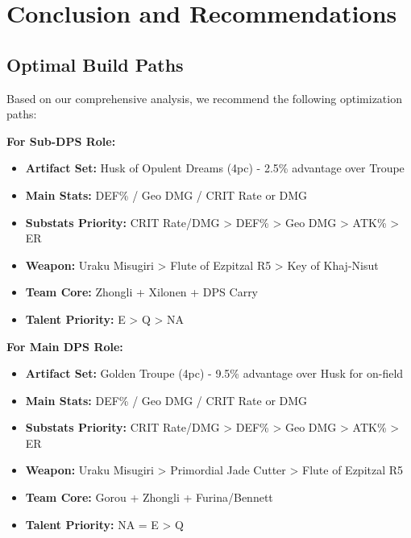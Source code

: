 \documentclass[12pt,a4paper]{article}
\begin{document}
\section{Conclusion and Recommendations}

\subsection{Optimal Build Paths}

Based on our comprehensive analysis, we recommend the following optimization paths:

\begin{tcolorbox}[colback=c0color!5, colframe=c0color, title=C0 Chiori Recommendations]
\textbf{For Sub-DPS Role:}
\begin{itemize}
    \item \textbf{Artifact Set:} Husk of Opulent Dreams (4pc) - 2.5\% advantage over Troupe
    \item \textbf{Main Stats:} DEF\% / Geo DMG / CRIT Rate or DMG
    \item \textbf{Substats Priority:} CRIT Rate/DMG > DEF\% > Geo DMG > ATK\% > ER
    \item \textbf{Weapon:} Uraku Misugiri > Flute of Ezpitzal R5 > Key of Khaj-Nisut
    \item \textbf{Team Core:} Zhongli + Xilonen + DPS Carry
    \item \textbf{Talent Priority:} E > Q > NA
\end{itemize}
\end{tcolorbox}

\begin{tcolorbox}[colback=c6color!5, colframe=c6color, title=C6 Chiori Recommendations]
\textbf{For Main DPS Role:}
\begin{itemize}
    \item \textbf{Artifact Set:} Golden Troupe (4pc) - 9.5\% advantage over Husk for on-field
    \item \textbf{Main Stats:} DEF\% / Geo DMG / CRIT Rate or DMG
    \item \textbf{Substats Priority:} CRIT Rate/DMG > DEF\% > Geo DMG > ATK\% > ER
    \item \textbf{Weapon:} Uraku Misugiri > Primordial Jade Cutter > Flute of Ezpitzal R5
    \item \textbf{Team Core:} Gorou + Zhongli + Furina/Bennett
    \item \textbf{Talent Priority:} NA = E > Q
\end{itemize}
\end{tcolorbox}
\end{document}

